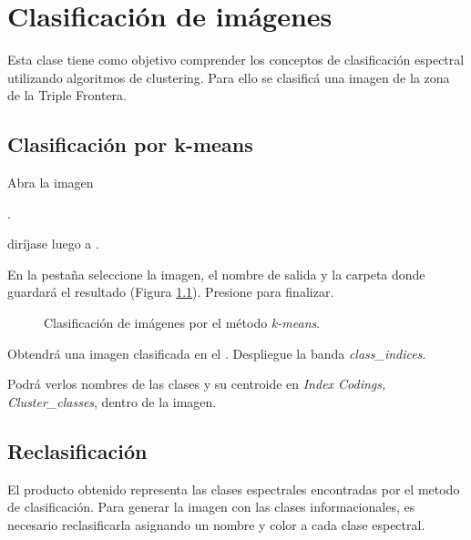 \chapter{Clasificación de imágenes}

Esta clase tiene como objetivo comprender los conceptos de clasificación espectral utilizando algoritmos de clustering. Para ello se clasificá una imagen de la zona de la Triple Frontera.

\section{Clasificación por k-means}

Abra la imagen

\begin{center}
.
\end{center}

diríjase luego a .

En la pestaña  seleccione la imagen, el nombre de salida y la carpeta donde guardará el resultado (Figura \ref{fig:kmeans}). Presione  para finalizar.

\begin{figure}[h!]
    \centering
    \hspace{1cm}
    \caption{Clasificación de imágenes por el método \emph{k-means}.}
    \label{fig:kmeans}
\end{figure}

Obtendrá una imagen clasificada en el . Despliegue la banda \emph{class\_indices}.

Podrá verlos nombres de las clases y su centroide en \emph{Index Codings, Cluster\_classes}, dentro de la imagen.

\section{Reclasificación}


El producto obtenido representa las clases espectrales encontradas por el metodo de clasificación. Para generar la imagen con las clases informacionales, es necesario reclasificarla asignando un nombre y color a cada clase espectral.

